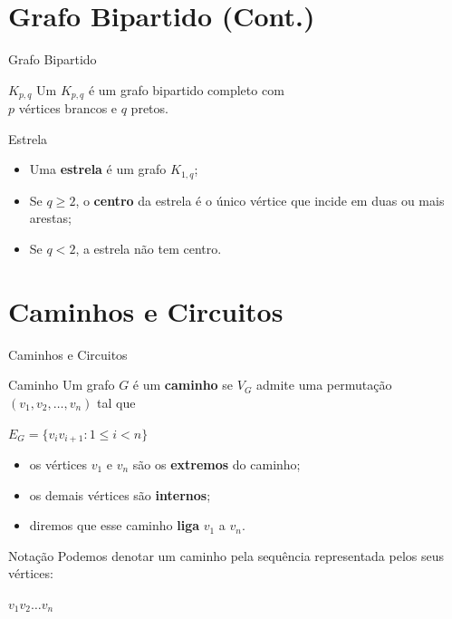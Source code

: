 \documentclass[xcolor=dvipsnames,table]{beamer}
\begin{document}
	\section{Grafo Bipartido (Cont.)}
	
	\begin{frame}{Grafo Bipartido}
		\begin{block}{$K_{p,q}$}
			Um $K_{p,q}$ é um grafo bipartido completo com \\$p$ vértices brancos e $q$ pretos.
		\end{block} \pause
		\begin{block}{Estrela}
			\begin{itemize}
				\item Uma {\bf estrela} é um grafo $K_{1,q}$; \pause
				\item Se $q \geq 2$, o {\bf centro} da estrela é o único vértice que incide em duas ou mais arestas; \pause
				\item Se $q < 2$, a estrela não tem centro.
			\end{itemize}
		\end{block}
	\end{frame}

	\section{Caminhos e Circuitos}
	\begin{frame}[shrink]{Caminhos e Circuitos}
		\begin{block}{Caminho}
			Um grafo $G$ é um {\bf caminho} se $V_G$ admite uma permutação $(v_1, v_2, \ldots , v_n)$ tal que
			\begin{center}
				$E_G = \{ v_i v_{i +1} : 1 \leq i < n \}$
			\end{center} \pause
			\begin{itemize}
				\item os vértices $v_1$ e $v_n$ são os {\bf extremos} do caminho; \pause
				\item os demais vértices são {\bf internos}; \pause
				\item diremos que esse caminho {\bf liga} $v_1$ a $v_n$.
			\end{itemize}
		\end{block} \pause
		\begin{block}{Notação}
			Podemos denotar um caminho pela sequência representada pelos seus vértices: \pause
			\begin{center}
				$v_1 v_2 \ldots v_n$		
			\end{center}
		\end{block}
	\end{frame}
	
\end{document}
